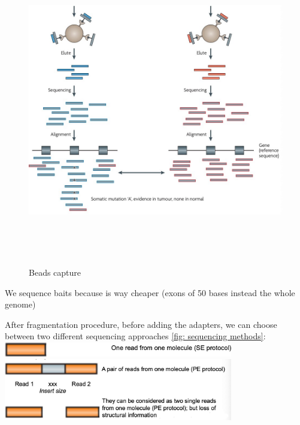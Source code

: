 \begin{figure}[H]
  \includegraphics[width=6.14828in,height=5.07625in]{image10.jpeg} \label{fig:
  DNA cancer variants detection}
  \centering
  \caption{Beads capture}
\end{figure}


We sequence baits because is way cheaper (exons of 50 bases instead the whole
genome)

After fragmentation procedure, before adding the adapters, we can choose between
two different sequencing approaches \ref{fig: sequencing methods}:\\


\includegraphics[width=0.75\textwidth]{image11.png}\\ \label{fig: sequencing
methods}
\includegraphics[width=0.75\textwidth]{image12.jpeg}

